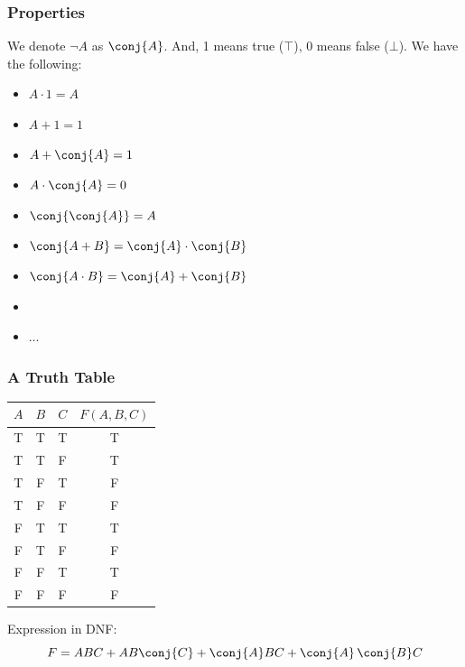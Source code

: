 \documentclass[xcolor=table]{beamer}
\begin{document}
\begin{frame}
    \frametitle{Properties}
    \hh
    We denote $\neg A$ as $\conj{A}$.
    And, 1 means true ($\top$), 0 means false ($\bot$). 
    We have the following: \vv
    \begin{itemize}
        \item $A \cdot 1 = A$
        \item $A + 1 = 1$
        \item $A + \conj{A} = 1$
        \item $A \cdot \conj{A} = 0$
        \item $\conj{\conj{A}}=A$
        \item $\conj{A+B}=\conj{A}\cdot \conj{B}$
        \item $\conj{A\cdot B}=\conj{A}+ \conj{B}$
        \item {}
        \item $\dots$
    \end{itemize}

\end{frame}
\begin{frame}
    \frametitle{A Truth Table}
    \begin{table}[]
        \begin{tabular}{||c|c|c||c||}
        \toprule
        \multicolumn{1}{||c|}{$A$} & \multicolumn{1}{c|}{$B$} & \multicolumn{1}{c||}{$C$} & \multicolumn{1}{c||}{$F(A,B,C)$} \\ 
        \midrule
        T  &  T &  T &  T  \\
        T  &  T &  F &  T  \\
        T  &  F &  T &  F  \\
        T  &  F &  F &  F  \\
        F  &  T &  T &  T  \\
        F  &  T &  F &  F  \\
        F  &  F &  T &  T  \\
        F  &  F &  F &  F  \\
        \bottomrule
        \end{tabular}
        \end{table}
    Expression in DNF:
        $$F = ABC + AB\conj{C} + \conj{A} BC + \conj{A}\,\conj{B}C$$
\end{frame}
\end{document}
